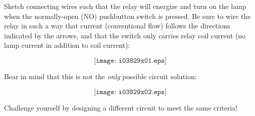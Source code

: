 

Sketch connecting wires such that the relay will energize and turn on the lamp when the normally-open (NO) pushbutton switch is pressed.  Be sure to wire the relay in such a way that current (conventional flow) follows the directions indicated by the arrows, and that the switch only carries relay coil current (no lamp current in addition to coil current):

$$\texttt{[image: i03829x01.eps]}$$







Bear in mind that this is not the {\it only} possible circuit solution:

$$\texttt{[image: i03829x02.eps]}$$

Challenge yourself by designing a different circuit to meet the same criteria! 










